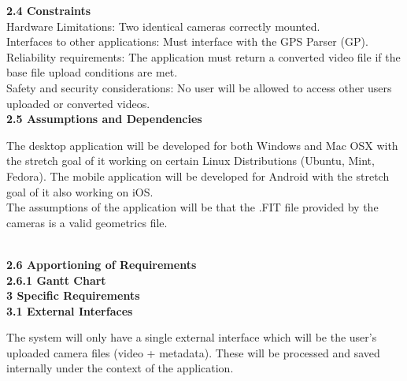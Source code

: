 \documentclass[10pt,draftclsnofoot,onecolumn]{IEEEtran}
\begin{document}
			\vspace{5mm}

		{\Medium\textbf{2.4 Constraints}} \\
			\vspace{5mm}
Hardware Limitations: Two identical cameras correctly mounted.\\
			\vspace{2mm}
Interfaces to other applications: Must interface with the GPS Parser (GP).\\
	\vspace{2mm}
Reliability requirements: The application must return a converted video file if the base file upload conditions are met.\\
	\vspace{2mm}
Safety and security considerations: No user will be allowed to access other users uploaded or converted videos.\\
			\vspace{5mm}
		{\Medium\textbf{2.5 Assumptions and Dependencies}} \\
					\vspace{5mm}

        The desktop application will be developed for both Windows and Mac OSX with the stretch goal of it working on certain Linux Distributions (Ubuntu, Mint, Fedora). The mobile application will be developed for Android with the stretch goal of it also working on iOS.\\
        	\vspace{2mm}
The assumptions of the application will be that the .FIT file provided by the cameras is a valid geometrics file.

        \\
        			\vspace{5mm}
{\Medium\textbf{2.6 Apportioning of Requirements}} \\
					\vspace{5mm}
{\Medium\textbf{2.6.1 Gantt Chart}} \\

        
        			\vspace{5mm}
{\Large\textbf{3 Specific Requirements}}\\
\vspace{5mm}
{\Medium\textbf{3.1 External Interfaces}} \\
\vspace{5mm}

The system will only have a single external interface which will be the user’s uploaded camera files (video + metadata). These will be processed and saved internally under the context of the application.\\
\vspace{2mm}
\end{document}
